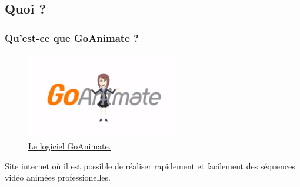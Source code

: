\subsection{Quoi ?} 
		\begin{frame}
			\frametitle{Qu'est-ce que GoAnimate ?}
			\begin{figure}
                     \centering
                     \includegraphics[width = 0.6\textwidth]{goanimate.png}
                     \caption{\tiny{\href{run:goanimate.png}{Le logiciel GoAnimate.}}}
                   \end{figure}
			Site internet où il est possible de réaliser rapidement et facilement des séquences vidéo animées professionelles.
			\end{frame}	
			
